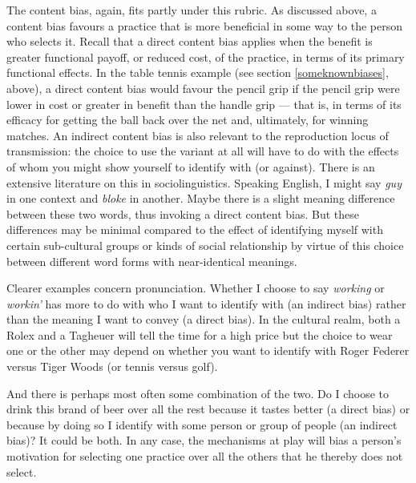 The content bias,  again, fits partly under this 
rubric. As discussed above, a content bias favours a practice that is 
more beneficial in some way to the person who selects it. Recall that a direct content bias applies when the benefit is 
greater functional payoff, or reduced cost, of the practice, in 
terms of its primary functional effects. In the table tennis example (see section \ref{someknownbiases}, above), a direct content bias  would favour the pencil grip 
if the pencil grip were lower in cost or greater in benefit than the 
handle grip --- that is, in terms of its efficacy for getting the ball back 
over the net and, ultimately, for winning matches. An indirect content bias is also relevant to the reproduction locus of transmission: the choice to use the variant at all will have to do with the effects of whom you might show yourself to identify with (or against). There is an extensive literature on this in sociolinguistics. Speaking English, I might say \textit{guy} 
in one context and \textit{bloke} in another. Maybe there is 
a slight meaning difference between these two words, thus invoking a 
direct content bias. But these differences may be minimal compared to 
the effect of identifying myself with certain sub-cultural groups or 
kinds of social relationship by virtue of this choice between different 
word forms with near-identical meanings. 



Clearer examples concern pronunciation. Whether I choose to say \textit{working} or \textit{workin'} has more to do with who I want to identify with 
(an indirect bias) rather than the meaning I want to convey (a direct 
bias). In the cultural realm, both a Rolex and a Tagheuer will tell the 
time for a high price but the choice to wear one or the other may depend on whether you want to 
identify with Roger Federer versus Tiger Woods (or tennis 
versus golf). 



And there is perhaps most often some combination of the two. Do I choose 
to drink this brand of beer over all the rest because it tastes better 
(a direct bias) or because by doing so I identify with some person or 
group of people (an indirect bias)? It could be both. In any case, the 
mechanisms at play will bias a person's motivation for 
selecting one practice over all the others that he thereby does not 
select. 



